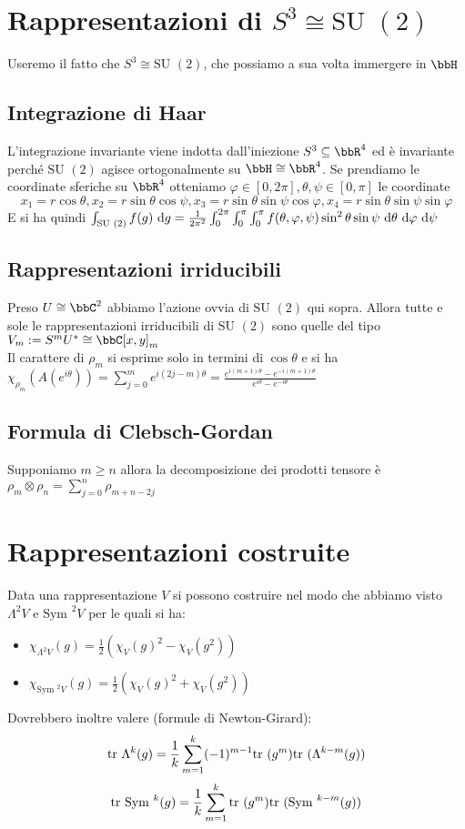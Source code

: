 \documentclass[a4paper,NoNotes,GeneralMath]{stdmdoc}
\newcommand{\SU}{\text{SU }}
\newcommand{\Sym}{\text{Sym }}
\begin{document}
	\section{Rappresentazioni di $S^3 \cong \SU(2)$}
	Useremo il fatto che $S^3 \cong \SU(2)$, che possiamo a sua volta immergere in $\bbH$
	
	\subsection{Integrazione di Haar}
	L'integrazione invariante viene indotta dall'iniezione $S^3 \subseteq \bbR^4$ ed è invariante perché $\SU(2)$ agisce ortogonalmente su $\bbH \cong \bbR^4$. Se prendiamo le coordinate sferiche su $\bbR^4$ otteniamo $\varphi \in [0, 2\pi], \theta, \psi \in [0, \pi]$ le coordinate
	$$ x_1 = r \cos \theta, x_2 = r \sin \theta \cos \psi, x_3 = r \sin \theta \sin \psi \cos \varphi, x_4 = r \sin \theta \sin \psi \sin \varphi $$
	E si ha quindi $\int_{\SU(2)} f(g) \de g = \frac{1}{2 \pi^2} \int_0^{2\pi} \int_0^\pi \int_0^\pi f(\theta, \varphi, \psi) \sin^2 \theta \sin \psi \de \theta \de \varphi \de \psi$
	
	\subsection{Rappresentazioni irriducibili}
	Preso $U \cong \bbC^2$ abbiamo l'azione ovvia di $\SU(2)$ qui sopra. Allora tutte e sole le rappresentazioni irriducibili di $\SU(2)$ sono quelle del tipo $V_m := S^m U^{*} \cong \bbC[x,y]_m$ \\
	Il carattere di $\rho_m$ si esprime solo in termini di $\cos\theta$ e si ha $\chi_{\rho_m}(A(e^{i\theta})) = \sum_{j=0}^m e^{i(2j-m)\theta} = \frac{e^{i(m+1)\theta} - e^{-i(m+1)\theta}}{e^{i\theta} - e^{-i\theta}}$
	
	\subsection{Formula di Clebsch-Gordan}
	Supponiamo $m \ge n$ allora la decomposizione dei prodotti tensore è $\rho_m \otimes \rho_n = \sum_{j=0}^n \rho_{m+n-2j}$

	\section{Rappresentazioni costruite}
	Data una rappresentazione $V$ si possono costruire nel modo che abbiamo visto $\Lambda^2 V$ e $\Sym^2 V$ per le quali si ha:
	\begin{itemize}
		\item $\chi_{\Lambda^2 V}(g) = \frac{1}{2} (\chi_V(g)^2 - \chi_V(g^2))$
		\item $\chi_{\Sym^2 V}(g) = \frac{1}{2} (\chi_V(g)^2 + \chi_V(g^2))$
	\end{itemize}
	Dovrebbero inoltre valere (formule di Newton-Girard): 
	$$ \mbox{tr } \Lambda^k(g) = \frac{1}{k} \sum_{m=1}^k (-1)^{m-1} \mbox{tr }(g^m) \mbox{tr }(\Lambda^{k-m}(g)) $$
	$$ \Tr \Sym^k(g) = \frac{1}{k} \sum_{m=1}^k \Tr(g^m) \Tr(\Sym^{k-m}(g)) $$
\end{document}
